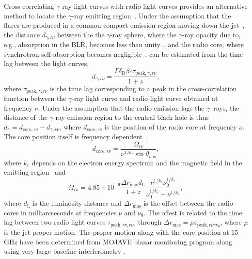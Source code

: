 \documentclass[twocolumn,linenumbers]{aastex62}
\newcommand{\Grays}{$\gamma$~rays\xspace}
\newcommand{\gray}{$\gamma$-ray\xspace}
\begin{document}
Cross-correlating \gray light curves with radio light curves provides an alternative method to locate the \gray emitting region~\citep[e.g.,][]{2014MNRAS.441.1899F}.
Under the assumption that the flares are produced in a common compact emission  region moving down the jet~\citep[e.g.,][]{2014MNRAS.445..428M},
the distance $d_{\gamma,r\nu}$ between the 
the \gray sphere, where the \gray opacity due to, e.g., absorption in the BLR, becomes less than unity~\citep{1995ApJ...441...79B}, and the 
radio core, where synchrotron-self-absorption becomes negligible~\citep[][]{1981ApJ...243..700K}, 
can be estimated from the time lag between the light curves, 
\begin{equation}
    d_{\gamma,r\nu} = \frac{\Gamma\delta_\mathrm{D}\beta c\tau_{\mathrm{peak},\gamma,r\nu}}{1 + z},
    \label{eq:dgamma-r}
\end{equation}
where $\tau_{\mathrm{peak},\gamma,r\nu}$ is the time lag corresponding to a peak in the cross-correlation function between the \gray light curve and radio light curve obtained at frequency $\nu$.
Under the assumption that the radio emission lags the \Grays, the distance of the \gray emission region to the central black hole is thus $d_\gamma = d_{\mathrm{core},r\nu} - d_{\gamma,r\nu}$, where $d_{\mathrm{core},r\nu}$ is the position of the radio core at frequency $\nu$.
The core position itself is frequency dependent~\citep[the core shift effect, see, e.g.,][]{1998A&A...330...79L},
\begin{equation}
    d_{\mathrm{core},r\nu} = \frac{\Omega_{r\nu}}{\nu^{1/k_r}\sin\theta_\mathrm{obs}},
     \label{eq:core-shift1}
\end{equation}
where $k_r$ depends on the electron energy spectrum and the magnetic field in the emitting region~\citep{1981ApJ...243..700K} and
\begin{equation}
    \Omega_{r\nu} = 4.85\times10^{-9} \frac{\Delta r_\mathrm{mas} d_\mathrm{L}}{1 + z}\frac{\nu^{1/k_r}\nu_0^{1/k_r}}{\nu_0^{1/k_r}-\nu^{1/k_r}},
    \label{eq:core-shift2}
\end{equation}
where $d_\mathrm{L}$ is the luminosity distance and $\Delta r_\mathrm{mas}$ is the offset between the radio cores in milliarcseconds at frequencies $\nu$ and $\nu_0$. 
The offest is related to the time lag between two radio light curves $\tau_{\mathrm{peak},r\nu,r\nu_0}$ through 
$\Delta r_\mathrm{mas} = \mu \tau_{\mathrm{peak},r\nu r\nu_0}$, where $\mu$ is the jet proper motion. 
The proper motion along with the core position at 15\,GHz have been determined from
MOJAVE blazar monitoring program along using very large baseline interferometry \citep[VLBI][]{2012A&A...545A.113P,2016AJ....152...12L}.
\end{document}
